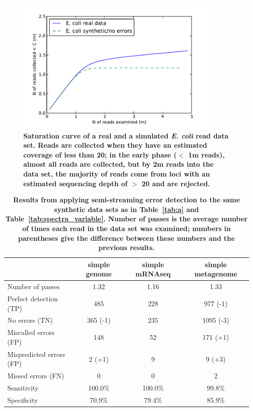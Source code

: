 \documentclass{article}
\begin{document}
\begin{figure}[!ht]
 \centerline{\includegraphics[width=4in]{./figures/saturation}}
\caption{\bf Saturation curve of a real and a simulated {\em E. coli}
  read data set.  Reads are collected when they have an estimated
  coverage of less than 20; in the early phase ($<$ 1m reads), almost
  all reads are collected, but by 2m reads into the data set, the
  majority of reads come from loci with an estimated sequencing depth
  of $>$ 20 and are rejected.}
\label{fig:saturation}
\end{figure}


\begin{table}
\centering
\begin{tabular}{|l|c||c||c|}
\hline
& {\bf simple genome}     & {\bf simple mRNAseq} & {\bf simple metagenome} \\
\hline
Number of passes & 1.32 & 1.16 & 1.33 \\
\hline
Perfect detection (TP)    & 485                 & 228     & 977 (-1) \\
No errors (TN)            & 365 (-1)            & 235     & 1095 (-3) \\
Miscalled errors (FP)     & 148                 & 52      & 171 (+1) \\
Mispredicted errors (FP)  & 2 (+1)              & 9       & 9 (+3) \\
Missed errors (FN)        & 0                   & 0       & 2 \\
\hline
Sensitivity               & 100.0\%             & 100.0\% & 99.8\% \\
Specificity               & 70.9\%              & 79.4\%  & 85.9\% \\
\hline
\end{tabular}
\caption{{\bf Results from applying semi-streaming error detection to the
    same synthetic data sets as in Table~\ref{tab:a} and
    Table~\ref{tab:spectra_variable}.  Number of passes is the average
    number of times each read in the data set was examined; numbers in
    parentheses give the difference between these numbers and the
    previous results.}}
\label{tab:spectra_streaming}

\end{table}
\end{document}
